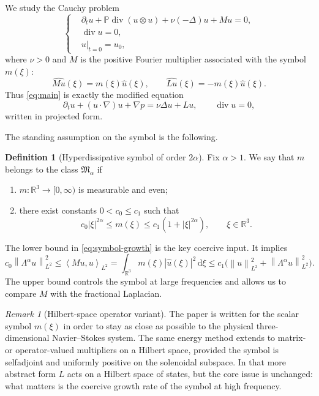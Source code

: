 \documentclass[11pt]{article}
\theoremstyle{definition}
\newtheorem{definition}[theorem]{Definition}
\theoremstyle{remark}
\newtheorem{remark}[theorem]{Remark}
\newcommand{\R}{\mathbb{R}}
\newcommand{\Pcal}{\mathbb{P}}
\newcommand{\dd}{\,\mathrm{d}}
\newcommand{\ip}[2]{\left\langle #1,#2\right\rangle}
\newcommand{\norm}[1]{\left\lVert #1\right\rVert}
\newcommand{\abs}[1]{\left\lvert #1\right\rvert}
\newcommand{\diver}{\operatorname{div}}
\begin{document}
We study the Cauchy problem
\begin{equation}\label{eq:main}
\left\{
\begin{aligned}
&\partial_t u + \Pcal \diver (u\otimes u) + \nu(-\Delta)u + M u = 0,
\\
&\diver u = 0,
\\
&u|_{t=0}=u_0,
\end{aligned}
\right.
\end{equation}
where $\nu>0$ and $M$ is the positive Fourier multiplier associated with the symbol $m(\xi)$:
\[
\widehat{M u}(\xi)=m(\xi)\hat u(\xi),
\qquad
\widehat{L u}(\xi)=-m(\xi)\hat u(\xi).
\]
Thus \eqref{eq:main} is exactly the modified equation
\[
\partial_t u + (u\cdot\nabla)u + \nabla p = \nu \Delta u + L u,
\qquad \diver u =0,
\]
written in projected form.

The standing assumption on the symbol is the following.

\begin{definition}[Hyperdissipative symbol of order $2\alpha$]\label{def:symbol}
Fix $\alpha>1$. We say that $m$ belongs to the class $\mathfrak M_\alpha$ if
\begin{enumerate}[label=(\alph*)]
\item $m:\R^3\to[0,\infty)$ is measurable and even;
\item there exist constants $0<c_0\le c_1$ such that
\begin{equation}\label{eq:symbol-growth}
c_0 |\xi|^{2\alpha} \le m(\xi) \le c_1 (1+|\xi|^{2\alpha}),
\qquad \xi\in\R^3.
\end{equation}
\end{enumerate}
\end{definition}

The lower bound in \eqref{eq:symbol-growth} is the key coercive input. It implies
\begin{equation}\label{eq:coercive-equivalence}
c_0 \norm{\Lambda^\alpha u}_{L^2}^2
\le
\ip{M u}{u}_{L^2}
=
\int_{\R^3} m(\xi)\abs{\hat u(\xi)}^2 \dd \xi
\le
c_1 \bigl(\norm{u}_{L^2}^2 + \norm{\Lambda^\alpha u}_{L^2}^2\bigr).
\end{equation}
The upper bound controls the symbol at large frequencies and allows us to compare $M$ with the fractional Laplacian.

\begin{remark}[Hilbert-space operator variant]
The paper is written for the scalar symbol $m(\xi)$ in order to stay as close as possible to the physical three-dimensional Navier--Stokes system. The same energy method extends to matrix- or operator-valued multipliers on a Hilbert space, provided the symbol is selfadjoint and uniformly positive on the solenoidal subspace. In that more abstract form $L$ acts on a Hilbert space of states, but the core issue is unchanged: what matters is the coercive growth rate of the symbol at high frequency.
\end{remark}
\end{document}
